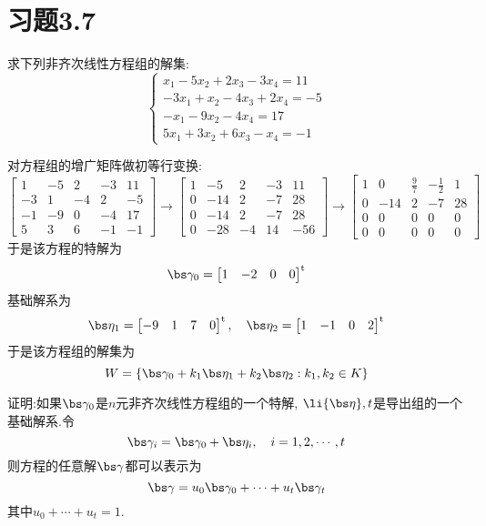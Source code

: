 \documentclass{ctexart}
\begin{document}
\section*{习题3.7}
\begin{homework}[1(1)]
    求下列非齐次线性方程组的解集:
    \[\left\{\begin{array}{l}
        x_1-5x_2+2x_3-3x_4=11\\
        -3x_1+x_2-4x_3+2x_4=-5\\
        -x_1-9x_2-4x_4=17\\
        5x_1+3x_2+6x_3-x_4=-1
    \end{array}\right.\]
\end{homework}
\begin{solution}
    对方程组的增广矩阵做初等行变换:
    \[\begin{bmatrix}
        1&-5&2&-3&11\\
        -3&1&-4&2&-5\\
        -1&-9&0&-4&17\\
        5&3&6&-1&-1
    \end{bmatrix}\longrightarrow\begin{bmatrix}
        1&-5&2&-3&11\\
        0&-14&2&-7&28\\
        0&-14&2&-7&28\\
        0&-28&-4&14&-56
    \end{bmatrix}\longrightarrow\begin{bmatrix}
        1&0&\frac97&-\frac12&1\\
        0&-14&2&-7&28\\
        0&0&0&0&0\\
        0&0&0&0&0
    \end{bmatrix}\]
    于是该方程的特解为
    \[\bs\gamma_0=\begin{bmatrix}
        1&-2&0&0
    \end{bmatrix}^{\text{t}}\]
    基础解系为
    \[\bs\eta_1=\begin{bmatrix}
        -9&1&7&0
    \end{bmatrix}^{\text{t}},\quad\bs\eta_2=\begin{bmatrix}
        1&-1&0&2
    \end{bmatrix}^{\text{t}}\]
    于是该方程组的解集为
    \[W=\left\{\bs\gamma_0+k_1\bs\eta_1+k_2\bs\eta_2:k_1,k_2\in K\right\}\]
\end{solution}
\begin{homework}[4]
    证明:如果$\bs\gamma_0$是$n$元非齐次线性方程组的一个特解, $\li{\bs\eta},t$是导出组的一个基础解系.令
    \[\bs\gamma_i=\bs\gamma_0+\bs\eta_i,\quad i=1,2,\cdots,t\]
    则方程的任意解$\bs\gamma$都可以表示为
    \[\bs\gamma=u_0\bs\gamma_0+\cdots+u_t\bs\gamma_t\]
    其中$u_0+\cdots+u_t=1$.
\end{homework}
\end{document}
